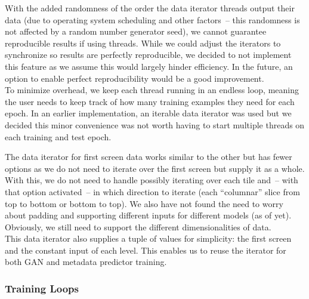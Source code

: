 With the added randomness of the order the data iterator threads
output their data (due to operating system scheduling and other
factors~-- this randomness is not affected by a random number generator
seed), we cannot guarantee reproducible results if using threads.
While we could adjust the iterators to synchronize so results are
perfectly reproducible, we decided to not implement this feature as we
assume this would largely hinder efficiency. In the future, an option
to enable perfect reproducibility would be a good improvement. \\
To minimize overhead, we keep each thread running in an endless loop,
meaning the user needs to keep track of how many training examples
they need for each epoch. In an earlier implementation, an iterable
data iterator was used but we decided this minor convenience was not
worth having to start multiple threads on each training and test
epoch.

The data iterator for first screen data works similar to the other but
has fewer options as we do not need to iterate over the first screen
but supply it as a whole. With this, we do not need to handle possibly
iterating over each tile and~-- with that option activated~-- in which
direction to iterate (each ``columnar'' slice from top to bottom or
bottom to top). We also have not found the need to worry about padding
and supporting different inputs for different models (as of yet).
Obviously, we still need to support the different dimensionalities of
data. \\
This data iterator also supplies a tuple of values for simplicity: the
first screen and the constant input of each level. This enables us to
reuse the iterator for both GAN and metadata predictor training.

\subsubsection{Training Loops}




